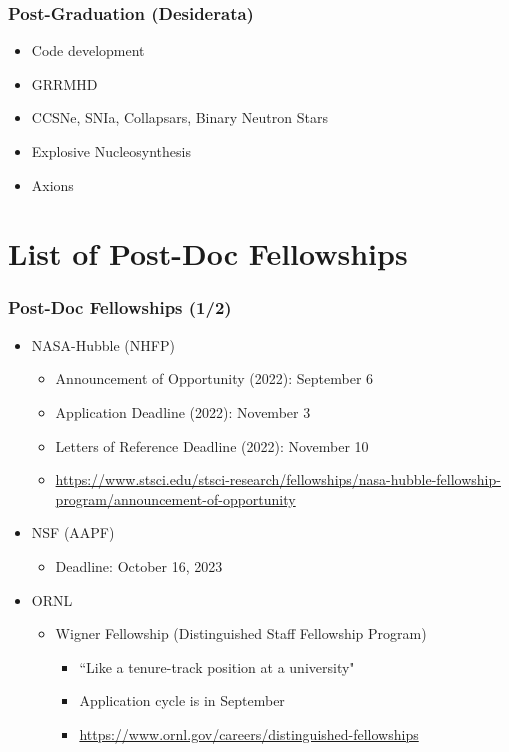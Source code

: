 \documentclass{beamer}
\begin{document}
\begin{frame}
\frametitle{Post-Graduation (Desiderata)}

  \begin{itemize}
    \item
      Code development
    \item
      GRRMHD
    \item
      CCSNe, SNIa, Collapsars, Binary Neutron Stars
    \item
      Explosive Nucleosynthesis
    \item
      Axions
  \end{itemize}

\end{frame}

\section{List of Post-Doc Fellowships}

\begin{frame}
\frametitle{Post-Doc Fellowships (1/2)}

  \begin{itemize}
    \item
      NASA-Hubble (NHFP)
      \begin{itemize}
        \item
          Announcement of Opportunity (2022): September 6
        \item
          Application Deadline (2022): November 3
        \item
          Letters of Reference Deadline (2022): November 10
        \item
          \url{https://www.stsci.edu/stsci-research/fellowships/nasa-hubble-fellowship-program/announcement-of-opportunity}
      \end{itemize}
    \item
      NSF (AAPF)
      \begin{itemize}
        \item
          Deadline: October 16, 2023
      \end{itemize}
    \item
      ORNL
      \begin{itemize}
        \item
          Wigner Fellowship (Distinguished Staff Fellowship Program)
          \begin{itemize}
            \item
              ``Like a tenure-track position at a university"
            \item
              Application cycle is in September
            \item
              \url{https://www.ornl.gov/careers/distinguished-fellowships}
          \end{itemize}
      \end{itemize}
  \end{itemize}
\end{frame}
\end{document}
